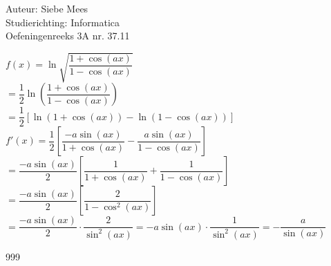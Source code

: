 \documentclass[a4paper]{article}
\begin{document}
  
\noindent \large Auteur: Siebe Mees \\
\noindent \large Studierichting: Informatica\\
\noindent \large Oefeningenreeks 3A nr. 37.11\\

\medskip

\normalsize

$f(x) = \ln \sqrt{\dfrac{1 + \cos(ax)}{1 - \cos(ax)}}$\\

$ = \dfrac{1}{2} \ln \left( \dfrac{1 + \cos(ax)}{1 - \cos(ax)} \right)$\\

$ = \dfrac{1}{2} \left[ \ln(1 + \cos(ax)) - \ln(1 - \cos(ax)) \right]$\\

$f'(x) = \dfrac{1}{2} \left[ \dfrac{-a\sin(ax)}{1 + \cos(ax)} - \dfrac{a\sin(ax)}{1 - \cos(ax)} \right]$\\

$ = \dfrac{-a\sin(ax)}{2} \left[ \dfrac{1}{1 + \cos(ax)} + \dfrac{1}{1 - \cos(ax)} \right]$\\

$ = \dfrac{-a\sin(ax)}{2} \left[ \dfrac{2}{1 - \cos^2(ax)} \right]$\\

$= \dfrac{-a\sin(ax)}{2} \cdot \dfrac{2}{\sin^2(ax)} = -a\sin(ax) \cdot \dfrac{1}{\sin^2(ax)} = -\dfrac{a}{\sin(ax)}$\\

\begin{thebibliography}{999}
\end{thebibliography}
\end{document}
